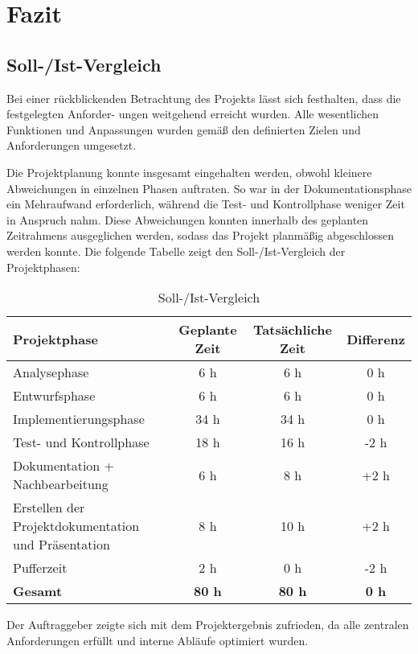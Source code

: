 \section{Fazit} 
\label{sec:Fazit}

\subsection{Soll-/Ist-Vergleich}
\label{sec:SollIstVergleich}

Bei einer rückblickenden Betrachtung des Projekts lässt sich festhalten, dass die festgelegten Anforder-
ungen weitgehend erreicht wurden. Alle wesentlichen Funktionen und Anpassungen wurden gemäß den definierten Zielen und Anforderungen umgesetzt.

Die Projektplanung konnte insgesamt eingehalten werden, obwohl kleinere Abweichungen in einzelnen Phasen auftraten. So war in der Dokumentationsphase ein Mehraufwand erforderlich, während die Test- und Kontrollphase weniger Zeit in Anspruch nahm. Diese Abweichungen konnten innerhalb des geplanten Zeitrahmens ausgeglichen werden, sodass das Projekt planmäßig abgeschlossen werden konnte. Die folgende Tabelle zeigt den Soll-/Ist-Vergleich der Projektphasen:

\begin{table}[h]
\centering
\caption{Soll-/Ist-Vergleich}
\label{tab:Vergleich}
\begin{tabular}{|l|c|c|c|}
\hline
\textbf{Projektphase} & \textbf{Geplante Zeit} & \textbf{Tatsächliche Zeit} & \textbf{Differenz} \\
\hline
Analysephase & 6 h & 6 h & 0 h \\
\hline
Entwurfsphase & 6 h & 6 h & 0 h \\
\hline
Implementierungsphase & 34 h & 34 h & 0 h \\
\hline
Test- und Kontrollphase & 18 h & 16 h & -2 h \\
\hline
Dokumentation + Nachbearbeitung & 6 h & 8 h & +2 h \\
\hline
Erstellen der Projektdokumentation und Präsentation & 8 h & 10 h & +2 h \\
\hline
Pufferzeit & 2 h & 0 h & -2 h \\
\hline
\textbf{Gesamt} & \textbf{80 h} & \textbf{80 h} & \textbf{0 h} \\
\hline
\end{tabular}
\end{table}

Der Auftraggeber zeigte sich mit dem Projektergebnis zufrieden, da alle zentralen Anforderungen erfüllt und interne Abläufe optimiert wurden.

